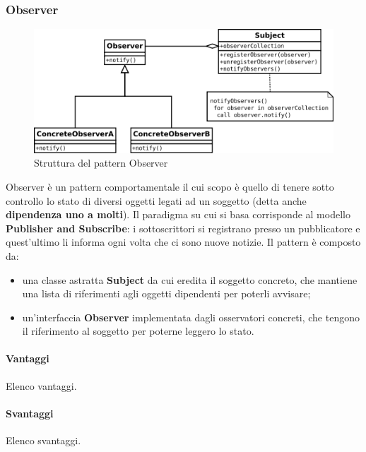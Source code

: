 \documentclass[../SpecificaTecnica.tex]{subfiles}
\begin{document}
		\subsubsection{Observer}
			\begin{figure}[!h]
				\centering
				\includegraphics[scale=0.6]{pattern/observer}
				\caption{Struttura del pattern Observer}
				\label{fig:Struttura_Observer}
				\end{figure}
			Observer è un pattern comportamentale il cui scopo è quello di tenere sotto controllo lo stato di diversi oggetti legati ad un soggetto (detta anche \textbf{dipendenza uno a molti}). Il paradigma su cui si basa corrisponde al modello \textbf{Publisher and Subscribe}: i sottoscrittori si registrano presso un pubblicatore e quest'ultimo li informa ogni volta che ci sono nuove notizie. Il pattern è composto da:
				\begin{itemize}
					\item una classe astratta \textbf{Subject} da cui eredita il soggetto concreto, che mantiene una lista di riferimenti agli oggetti dipendenti per poterli avvisare;
					\item un'interfaccia \textbf{Observer} implementata dagli osservatori concreti, che tengono il riferimento al soggetto per poterne leggero lo stato.
				\end{itemize}
			\paragraph{Vantaggi}
				Elenco vantaggi.
			\paragraph{Svantaggi}
				Elenco svantaggi.
\end{document}
